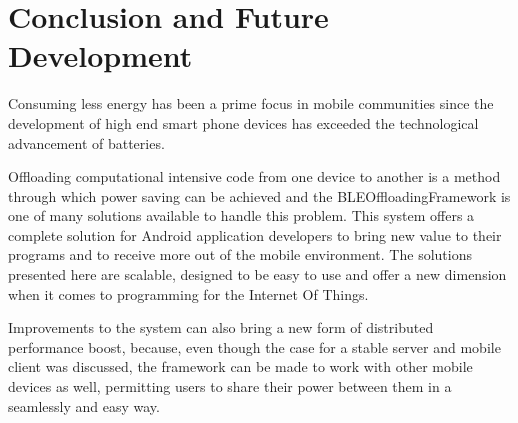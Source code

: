 \chapter{Conclusion and Future Development}
\label{chapter:conclusion}

Consuming less energy has been a prime focus in mobile communities since the development of high end smart phone devices has exceeded the technological advancement of batteries.

Offloading computational intensive code from one device to another is a method through which power saving can be achieved and the BLEOffloadingFramework is one of many solutions available to handle this problem. This system offers a complete solution for Android application developers to bring new value to their programs and to receive more out of the mobile environment. The solutions presented here are scalable, designed to be easy to use and offer a new dimension when it comes to programming for the Internet Of Things.

Improvements to the system can also bring a new form of distributed performance boost, because, even though the case for a stable server and mobile client was discussed, the framework can be made to work with other mobile devices as well, permitting users to share their power between them in a seamlessly and easy way.